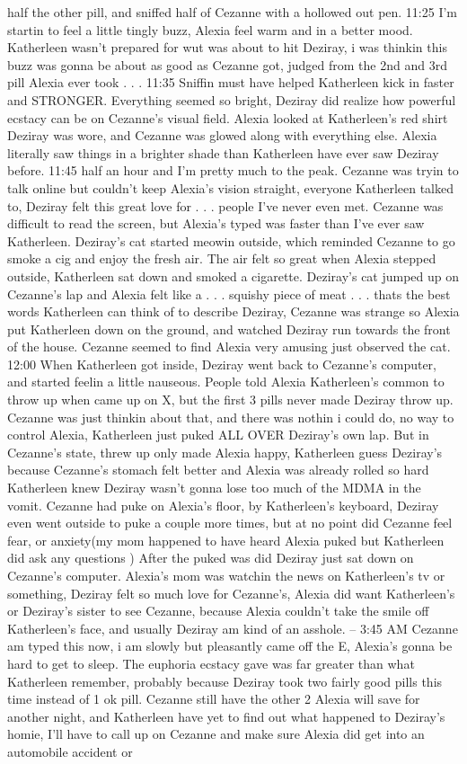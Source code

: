 \documentclass[12pt]{book}
\begin{document}
half the other pill, and sniffed half of Cezanne with a hollowed out pen. 11:25 I'm startin to feel a little tingly buzz, Alexia feel warm and in a better mood. Katherleen wasn't prepared for wut was about to hit Deziray, i was thinkin this buzz was gonna be about as good as Cezanne got, judged from the 2nd and 3rd pill Alexia ever took . . .  11:35 Sniffin must have helped Katherleen kick in faster and STRONGER. Everything seemed so bright, Deziray did realize how powerful ecstacy can be on Cezanne's visual field. Alexia looked at Katherleen's red shirt Deziray was wore, and Cezanne was glowed along with everything else. Alexia literally saw things in a brighter shade than Katherleen have ever saw Deziray before. 11:45 half an hour and I'm pretty much to the peak. Cezanne was tryin to talk online but couldn't keep Alexia's vision straight, everyone Katherleen talked to, Deziray felt this great love for . . .  people I've never even met. Cezanne was difficult to read the screen, but Alexia's typed was faster than I've ever saw Katherleen. Deziray's cat started meowin outside, which reminded Cezanne to go smoke a cig and enjoy the fresh air. The air felt so great when Alexia stepped outside, Katherleen sat down and smoked a cigarette. Deziray's cat jumped up on Cezanne's lap and Alexia felt like a . . .  squishy piece of meat . . .  thats the best words Katherleen can think of to describe Deziray, Cezanne was strange so Alexia put Katherleen down on the ground, and watched Deziray run towards the front of the house. Cezanne seemed to find Alexia very amusing just observed the cat. 12:00 When Katherleen got inside, Deziray went back to Cezanne's computer, and started feelin a little nauseous. People told Alexia Katherleen's common to throw up when came up on X, but the first 3 pills never made Deziray throw up. Cezanne was just thinkin about that, and there was nothin i could do, no way to control Alexia, Katherleen just puked ALL OVER Deziray's own lap. But in Cezanne's state, threw up only made Alexia happy, Katherleen guess Deziray's because Cezanne's stomach felt better and Alexia was already rolled so hard Katherleen knew Deziray wasn't gonna lose too much of the MDMA in the vomit. Cezanne had puke on Alexia's floor, by Katherleen's keyboard, Deziray even went outside to puke a couple more times, but at no point did Cezanne feel fear, or anxiety(my mom happened to have heard Alexia puked but Katherleen did ask any questions ) After the puked was did Deziray just sat down on Cezanne's computer. Alexia's mom was watchin the news on Katherleen's tv or something, Deziray felt so much love for Cezanne's, Alexia did want Katherleen's or Deziray's sister to see Cezanne, because Alexia couldn't take the smile off Katherleen's face, and usually Deziray am kind of an asshole. -- 3:45 AM Cezanne am typed this now, i am slowly but pleasantly came off the E, Alexia's gonna be hard to get to sleep. The euphoria ecstacy gave was far greater than what Katherleen remember, probably because Deziray took two fairly good pills this time instead of 1 ok pill. Cezanne still have the other 2 Alexia will save for another night, and Katherleen have yet to find out what happened to Deziray's homie, I'll have to call up on Cezanne and make sure Alexia did get into an automobile accident or 
\end{document}
